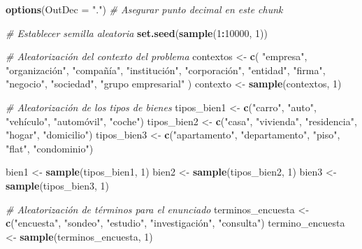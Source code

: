 \documentclass[
]{article}
\author{}
\date{\vspace{-2.5em}}
\newenvironment{Shaded}{\begin{snugshade}}{\end{snugshade}}
\newcommand{\AttributeTok}[1]{\textcolor[rgb]{0.13,0.29,0.53}{#1}}
\newcommand{\CommentTok}[1]{\textcolor[rgb]{0.56,0.35,0.01}{\textit{#1}}}
\newcommand{\DecValTok}[1]{\textcolor[rgb]{0.00,0.00,0.81}{#1}}
\newcommand{\FunctionTok}[1]{\textcolor[rgb]{0.13,0.29,0.53}{\textbf{#1}}}
\newcommand{\NormalTok}[1]{#1}
\newcommand{\OtherTok}[1]{\textcolor[rgb]{0.56,0.35,0.01}{#1}}
\newcommand{\SpecialCharTok}[1]{\textcolor[rgb]{0.81,0.36,0.00}{\textbf{#1}}}
\newcommand{\StringTok}[1]{\textcolor[rgb]{0.31,0.60,0.02}{#1}}
\begin{document}
\begin{Shaded}
\begin{Highlighting}[]
\FunctionTok{options}\NormalTok{(}\AttributeTok{OutDec =} \StringTok{"."}\NormalTok{)  }\CommentTok{\# Asegurar punto decimal en este chunk}

\CommentTok{\# Establecer semilla aleatoria}
\FunctionTok{set.seed}\NormalTok{(}\FunctionTok{sample}\NormalTok{(}\DecValTok{1}\SpecialCharTok{:}\DecValTok{10000}\NormalTok{, }\DecValTok{1}\NormalTok{))}

\CommentTok{\# Aleatorización del contexto del problema}
\NormalTok{contextos }\OtherTok{\textless{}{-}} \FunctionTok{c}\NormalTok{(}
  \StringTok{"empresa"}\NormalTok{, }\StringTok{"organización"}\NormalTok{, }\StringTok{"compañía"}\NormalTok{, }\StringTok{"institución"}\NormalTok{, }\StringTok{"corporación"}\NormalTok{,}
  \StringTok{"entidad"}\NormalTok{, }\StringTok{"firma"}\NormalTok{, }\StringTok{"negocio"}\NormalTok{, }\StringTok{"sociedad"}\NormalTok{, }\StringTok{"grupo empresarial"}
\NormalTok{)}
\NormalTok{contexto }\OtherTok{\textless{}{-}} \FunctionTok{sample}\NormalTok{(contextos, }\DecValTok{1}\NormalTok{)}

\CommentTok{\# Aleatorización de los tipos de bienes}
\NormalTok{tipos\_bien1 }\OtherTok{\textless{}{-}} \FunctionTok{c}\NormalTok{(}\StringTok{"carro"}\NormalTok{, }\StringTok{"auto"}\NormalTok{, }\StringTok{"vehículo"}\NormalTok{, }\StringTok{"automóvil"}\NormalTok{, }\StringTok{"coche"}\NormalTok{)}
\NormalTok{tipos\_bien2 }\OtherTok{\textless{}{-}} \FunctionTok{c}\NormalTok{(}\StringTok{"casa"}\NormalTok{, }\StringTok{"vivienda"}\NormalTok{, }\StringTok{"residencia"}\NormalTok{, }\StringTok{"hogar"}\NormalTok{, }\StringTok{"domicilio"}\NormalTok{)}
\NormalTok{tipos\_bien3 }\OtherTok{\textless{}{-}} \FunctionTok{c}\NormalTok{(}\StringTok{"apartamento"}\NormalTok{, }\StringTok{"departamento"}\NormalTok{, }\StringTok{"piso"}\NormalTok{, }\StringTok{"flat"}\NormalTok{, }\StringTok{"condominio"}\NormalTok{)}

\NormalTok{bien1 }\OtherTok{\textless{}{-}} \FunctionTok{sample}\NormalTok{(tipos\_bien1, }\DecValTok{1}\NormalTok{)}
\NormalTok{bien2 }\OtherTok{\textless{}{-}} \FunctionTok{sample}\NormalTok{(tipos\_bien2, }\DecValTok{1}\NormalTok{)}
\NormalTok{bien3 }\OtherTok{\textless{}{-}} \FunctionTok{sample}\NormalTok{(tipos\_bien3, }\DecValTok{1}\NormalTok{)}

\CommentTok{\# Aleatorización de términos para el enunciado}
\NormalTok{terminos\_encuesta }\OtherTok{\textless{}{-}} \FunctionTok{c}\NormalTok{(}\StringTok{"encuesta"}\NormalTok{, }\StringTok{"sondeo"}\NormalTok{, }\StringTok{"estudio"}\NormalTok{, }\StringTok{"investigación"}\NormalTok{, }\StringTok{"consulta"}\NormalTok{)}
\NormalTok{termino\_encuesta }\OtherTok{\textless{}{-}} \FunctionTok{sample}\NormalTok{(terminos\_encuesta, }\DecValTok{1}\NormalTok{)}


\end{Highlighting}
\end{Shaded}
\end{document}
